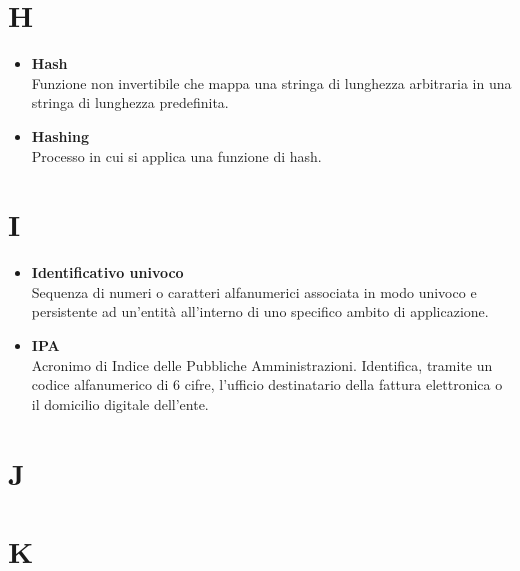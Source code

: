 \documentclass[a4paper,12pt]{article}
\begin{document}
        \section*{H} {
            \begin{itemize}
                \item \textbf{Hash}\\
                    Funzione non invertibile che mappa una stringa di lunghezza arbitraria in una stringa di lunghezza predefinita.
                \item \textbf{Hashing}\\
                    Processo in cui si applica una funzione di hash.
            \end{itemize}
        }
        \newpage

        \section*{I} {
            \begin{itemize}
                \item \textbf{Identificativo univoco}\\
                    Sequenza di numeri o caratteri alfanumerici associata in modo univoco e persistente ad un'entità all'interno di uno specifico ambito di applicazione. 
                \item \textbf{IPA}\\
                    Acronimo di Indice delle Pubbliche Amministrazioni. Identifica, tramite un codice alfanumerico di 6 cifre, l'ufficio destinatario della fattura elettronica o il domicilio digitale dell'ente.                \end{itemize}            
        }
        \newpage

        \section*{J} {
            
        }
        \newpage

        \section*{K} {
            
        }
        \newpage
\end{document}

